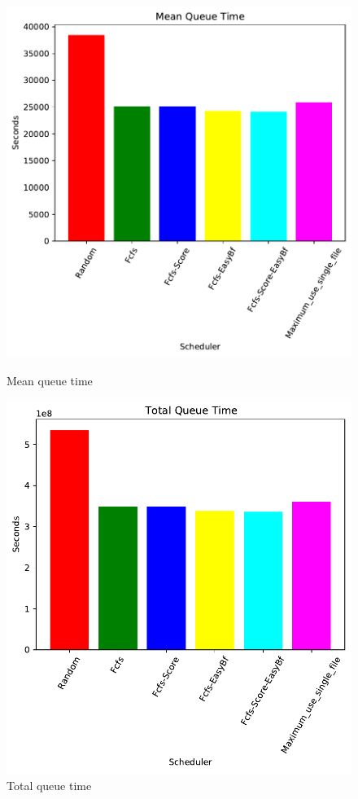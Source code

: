 \begin{figure}[H]
	\begin{minipage}[b]{0.5\linewidth}\centering\includegraphics[width=1\linewidth]{MBSS/plot/2022-03-16_Mean_queue_time450_128_32_256_4_1024.pdf}\caption{Mean queue time}\vspace{4ex}\end{minipage} 
	\begin{minipage}[b]{0.5\linewidth}\centering\includegraphics[width=1\linewidth]{MBSS/plot/2022-03-16_Total_queue_time450_128_32_256_4_1024.pdf}\caption{Total queue time}\vspace{4ex}\end{minipage}

\end{figure}
